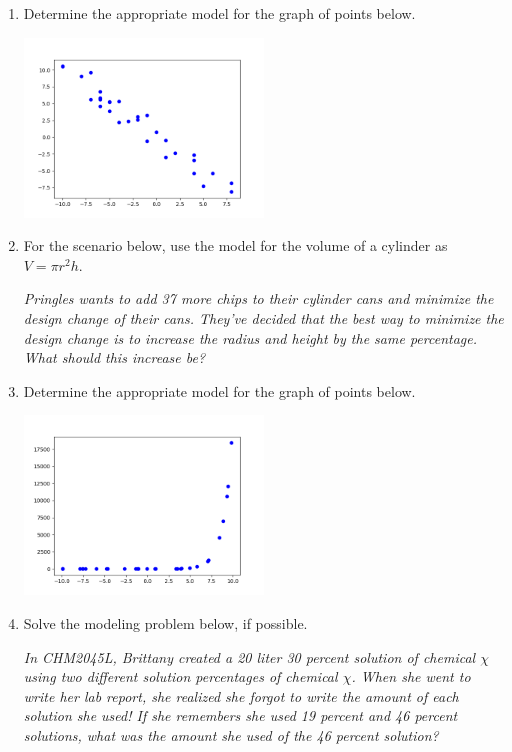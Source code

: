 \documentclass[14pt]{extbook}
\begin{document}
\begin{enumerate}
{\begin{center}
\end{center}
} \newpage
\item{
Determine the appropriate model for the graph of points below.
\begin{center}
    \includegraphics[width=0.5\textwidth]{../Figures/identifyModelGraph12CopyB.png}
\end{center}
} \newpage
\item{
For the scenario below, use the model for the volume of a cylinder as $V = \pi r^2 h$.
\begin{center}
    \textit{ Pringles wants to add 37  more chips to their cylinder cans and minimize the design change of their cans. They've decided that the best way to minimize the design change is to increase the radius and height by the same percentage. What should this increase be? }
\end{center}
} \newpage
\item{
Determine the appropriate model for the graph of points below.
\begin{center}
    \includegraphics[width=0.5\textwidth]{../Figures/identifyModelGraph12B.png}
\end{center}
} \newpage
\item{
Solve the modeling problem below, if possible.
\begin{center}
    \textit{ In CHM2045L, Brittany created a 20 liter 30 percent solution of chemical $\chi$ using two different solution percentages of chemical $\chi$. When she went to write her lab report, she realized she forgot to write the amount of each solution she used! If she remembers she used 19 percent and 46 percent solutions, what was the amount she used of the 46 percent solution? }

\end{center}}
\end{enumerate}
\end{document}
